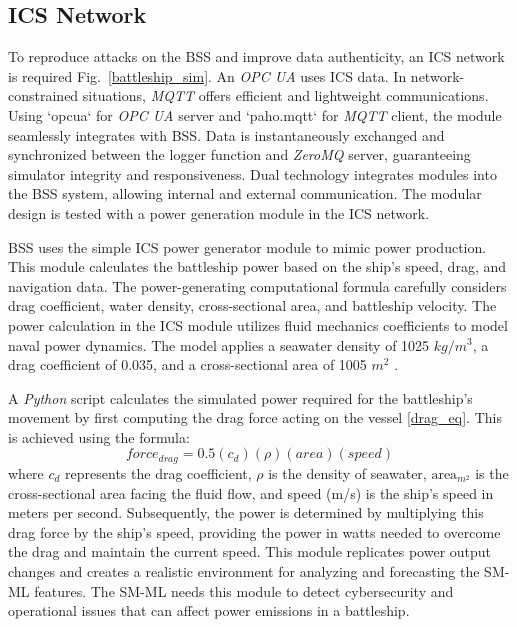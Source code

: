 \documentclass[conference]{IEEEtran}
\begin{document}
\subsection{ICS Network}
To reproduce attacks on the BSS and improve data authenticity, an ICS network is required Fig.~\ref{battleship_sim}. An \textit{OPC UA} uses ICS data. In network-constrained situations, \textit{MQTT} offers efficient and lightweight communications. Using `opcua` for \textit{OPC UA} server and `paho.mqtt` for \textit{MQTT} client, the module seamlessly integrates with BSS. Data is instantaneously exchanged and synchronized between the logger function and \textit{ZeroMQ} server, guaranteeing simulator integrity and responsiveness. Dual technology integrates modules into the BSS system, allowing internal and external communication. The modular design is tested with a power generation module in the ICS network.

BSS uses the simple ICS power generator module to mimic power production. This module calculates the battleship power based on the ship's speed, drag, and navigation data.   The power-generating computational formula carefully considers drag coefficient, water density, cross-sectional area, and battleship velocity. The power calculation in the ICS module utilizes fluid mechanics coefficients to model naval power dynamics. The model applies a seawater density of 1025 $kg/m^3$, a drag coefficient of 0.035, and a cross-sectional area of 1005 $m^2$ \cite{b14}.

A \textit{Python} script calculates the simulated power required for the battleship's movement by first computing the drag force acting on the vessel \eqref{drag_eq}. This is achieved using the formula:
\begin{equation}
force_{drag} = 0.5 (c_d )(\rho) (area) (speed) 
\label{drag_eq}
\end{equation}
where \( c_d \) represents the drag coefficient, \( \rho \) is the density of seawater, \( \text{area}_{m^2} \) is the cross-sectional area facing the fluid flow, and speed (m/s) is the ship's speed in meters per second. Subsequently, the power is determined by multiplying this drag force by the ship's speed, providing the power in watts needed to 
overcome the drag and maintain the current speed. 
This module replicates power output changes and creates a realistic environment for analyzing and forecasting the SM-ML features. The SM-ML needs this module to detect cybersecurity and operational issues that can affect power emissions in a battleship. 
\end{document}
